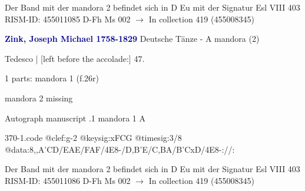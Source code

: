 \documentclass[twocolumn]{book}
\begin{document}
\newline Der Band mit der mandora 2 befindet sich in D Eu mit der Signatur Esl VIII 403
\newline RISM-ID: 455011085
\newline D-Fh  Ms 002
\newline $\rightarrow$ In collection 419 (455008345)
      
\newline \par \vspace{7pt} \textcolor{darkblue}{\textbf{Zink, Joseph Michael  1758-1829}}
\newline Deutsche Tänze - A
\newline mandora (2)
\newline \begin{itshape}[f.26r, at left:] Tedesco | [left before the accolade:] 47.\end{itshape} 
\newline \textcolor{darkblue}{}  1 parts: mandora 1  (f.26r)
\newline \begin{small} mandora 2 missing\end{small} 
\newline Autograph manuscript
.1  mandora 1  A  
\begin{filecontents*}{370-1.code}
@clef:g-2
@keysig:xFCG
@timesig:3/8
@data:8,,A'CD/EAE/FAF/4E8-/D,B'E/C,BA/B'CxD/4E8-://:
\end{filecontents*}
\newline
%

\newline Der Band mit der mandora 2 befindet sich in D Eu mit der Signatur Esl VIII 403
\newline RISM-ID: 455011086
\newline D-Fh  Ms 002
\newline $\rightarrow$ In collection 419 (455008345)
      
\end{document}
